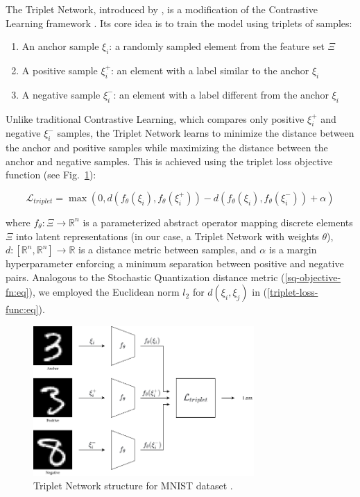 The Triplet Network, introduced by \cite{Hoffer_2015}, is a modification of the Contrastive Learning framework \cite{Khosla_2020}. Its core idea is to train the model using triplets of samples:

\begin{enumerate}
    \item An anchor sample $\xi_i$: a randomly sampled element from the feature set $\Xi$
    \item A positive sample $\xi^+_i$: an element with a label similar to the anchor $\xi_i$
    \item A negative sample $\xi^-_i$: an element with a label different from the anchor $\xi_i$
\end{enumerate}

Unlike traditional Contrastive Learning, which compares only positive $\xi^+_i$ and negative $\xi^-_i$ samples, the Triplet Network learns to minimize the distance between the anchor and positive samples while maximizing the distance between the anchor and negative samples. This is achieved using the triplet loss objective function (see Fig.~\ref{triplet-network:fig}):

\begin{equation}
    \label{triplet-loss-func:eq}
    \mathcal{L}_{triplet} = \max (0, d(f_{\theta}(\xi_i), f_{\theta}(\xi^+_i)) - d(f_{\theta}(\xi_i), f_{\theta}(\xi^-_i)) + \alpha)
\end{equation}

\noindent where $f_{\theta}: \Xi \to \mathbb{R}^n$ is a parameterized abstract operator mapping discrete elements $\Xi$ into latent representations (in our case, a Triplet Network with weights $\theta$), $d: [\mathbb{R}^n, \mathbb{R}^n] \to \mathbb{R}$ is a distance metric between samples, and $\alpha$ is a margin hyperparameter enforcing a minimum separation between positive and negative pairs. Analogous to the Stochastic Quantization distance metric (\ref{sq-objective-fn:eq}), we employed the Euclidean norm $l_2$ for $d(\xi_i, \xi_j)$ in (\ref{triplet-loss-func:eq}).

\begin{figure}
    \centering
    \includegraphics[width=0.75\textwidth]{figures/triplet_loss.png}
    \caption{Triplet Network structure for MNIST dataset \cite{lecun2010mnist}.} \label{triplet-network:fig}
\end{figure}

